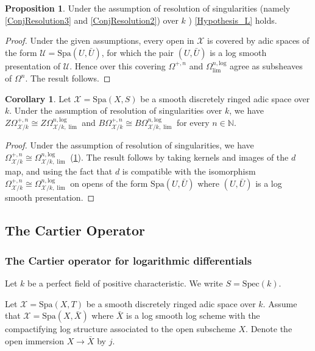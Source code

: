 \documentclass{amsart}
\def\Spa{\textrm{Spa}}
\def\Spec{\textrm{Spec}}
\theoremstyle{definition}
\newtheorem{proposition}[theorem]{Proposition}
\newtheorem{corollary}[theorem]{Corollary}
\newcommand\llog{\mathrm{log}}
\numberwithin{equation}{section}
\begin{document}
\begin{proposition}\label{Hypothesis_L_Resolution}
	Under the assumption of resolution of singularities (namely \cref{ConjResolution3} and \cref{ConjResolution2}) over $k$ ) \cref{Hypothesis_L} holds. 
\end{proposition}
\begin{proof}
	Under the given assumptions, every open in $\mathcal{X}$ is covered by adic spaces of the form $\mathcal{U}=\Spa(U,\bar{U})$, for which the pair $(U,\bar{U})$ is a log smooth presentation of $\mathcal{U}$. Hence over this covering $\Omega^{+,n}$ and $\Omega^{n,\llog}_{\lim}$ agree as subsheaves of $\Omega^{n}$. The result follows.
\end{proof}
\begin{corollary}
	Let $\mathcal{X}=\Spa(X,S)$ be a smooth discretely ringed adic space over $k$. Under the assumption of resolution of singularities over $k$, we have $Z\Omega^{+,n}_{\mathcal{X}/k}\cong Z\Omega^{n,\llog}_{\mathcal{X}/k,\lim}$ and $B\Omega^{+,n}_{\mathcal{X}/k}\cong B\Omega^{n,\llog}_{\mathcal{X}/k,\lim}$ for every $n\in \mathbb{N}$.
\end{corollary}
\begin{proof}
	Under the assumption of resolution of singularities, we have $\Omega^{+,n}_{\mathcal{X}/k}\cong \Omega^{n,\llog}_{\mathcal{X}/k,\lim}$ (\cref{Hypothesis_L_Resolution}). The result follows by taking kernels and images of the $d$ map, and using the fact that $d$ is compatible with the isomorphism $\Omega^{+,n}_{\mathcal{X}/k}\cong \Omega^{n,\llog}_{\mathcal{X}/k,\lim}$ on opens of the form $\Spa(U,\bar{U})$ where $(U,\bar{U})$ is a log smooth presentation.
\end{proof}\newpage
\subsection{The Cartier Operator}
\subsubsection*{The Cartier operator for logarithmic differentials}
Let $k$ be a perfect field of positive characteristic. We write $S=\Spec(k)$.

Let $\mathcal{X}=\Spa(X,T)$ be a smooth discretely ringed adic space over $k$. Assume that $\mathcal{X}=\Spa(X,\bar{X})$ where $\bar{X}$ is a log smooth log scheme with the compactifying log structure associated to the open subscheme $X$. Denote the open immersion $X\to \bar{X}$ by $j$.
\end{document}
